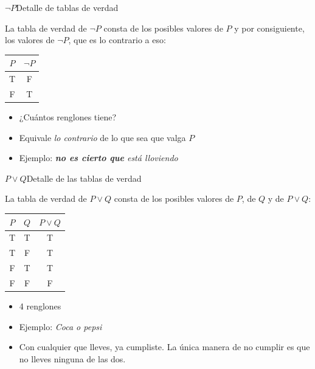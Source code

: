 \documentclass[spanish, c]{beamer}
\begin{document}
\begin{frame}{$\neg P$}{Detalle de tablas de verdad}

    La tabla de verdad de $\neg P$ consta de los posibles valores de $P$ y por consiguiente, los valores de $\neg P$, que es lo contrario a eso: \pause

\begin{table}[H]
    \begin{tabular}{@{}cc@{}}
    \toprule
    $P$ & $\neg P$ \\ \midrule
    T   & F        \\
    F   & T        \\ \bottomrule
    \end{tabular}
\end{table} \pause

\begin{itemize}[<+->]
    \item ¿Cuántos renglones tiene?
    \item Equivale \textit{lo contrario} de lo que sea que valga $P$
    \item Ejemplo: \textit{\textbf{no es cierto que} está lloviendo}
\end{itemize}
\end{frame}

\begin{frame}{$P \vee Q$}{Detalle de las tablas de verdad}

    La tabla de verdad de $P \vee Q$ consta de los posibles valores de $P$, de $Q$ y de $P \vee Q$:


\begin{table}[H]
    \begin{tabular}{@{}ccc@{}}
    \toprule
    $P$ & $Q$ & $P \vee Q$ \\ \midrule
    T   & T    & T          \\
    T   & F    & T          \\
    F   & T    & T          \\
    F   & F    & F          \\ \bottomrule
    \end{tabular}
\end{table}

\begin{itemize}
    \item 4 renglones
    \item Ejemplo: \textit{Coca o pepsi}
    \item Con cualquier que lleves, ya cumpliste. La única manera de no cumplir es que no lleves ninguna de las dos.
\end{itemize}
\end{frame}
\end{document}

